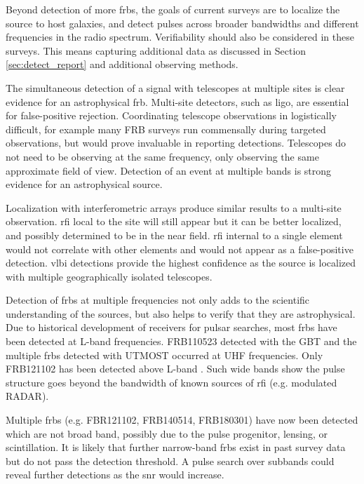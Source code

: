 \documentclass[a4paper,fleqn,usenatbib]{mnras}
\begin{document}
Beyond detection of more \glspl{frb}, the goals of current surveys are to
localize the source to host galaxies, and detect pulses across broader
bandwidths and different frequencies in the radio spectrum. Verifiability should
also be considered in these surveys. This means capturing additional data as
discussed in Section \ref{sec:detect_report} and additional observing methods.

The simultaneous detection of a signal with telescopes at multiple sites is
clear evidence for an astrophysical \gls{frb}.  Multi-site detectors, such as 
\gls{ligo}, are essential for false-positive rejection. Coordinating telescope
observations in logistically difficult, for example many FRB surveys run
commensally during targeted observations, but would prove invaluable in
reporting detections. Telescopes do not need to be observing at the same
frequency, only observing the same approximate field of view. Detection of an
event at multiple bands is strong evidence for an astrophysical source.

Localization with interferometric arrays produce similar results to a multi-site
observation. \gls{rfi} local to the site will still appear but it can be better
localized, and possibly determined to be in the near field. \gls{rfi} internal
to a single element would not correlate with other elements and would not appear
as a false-positive detection.  \gls{vlbi} detections provide the highest
confidence as the source is localized with multiple geographically isolated
telescopes.

Detection of \glspl{frb} at multiple frequencies not only adds to the scientific
understanding of the sources, but also helps to verify that they are
astrophysical.  Due to historical development of receivers for pulsar searches,
most \glspl{frb} have been detected at L-band frequencies. FRB110523
detected with the GBT and the multiple \glspl{frb} detected with UTMOST occurred
at UHF frequencies.  Only FRB121102 has been detected above L-band
\citep{atel10675}.  Such wide bands show the pulse structure goes beyond the
bandwidth of known sources of \gls{rfi} (e.g. modulated RADAR). 

Multiple \glspl{frb} (e.g. FBR121102, FRB140514, FRB180301) have now been
detected which are not broad band, possibly due to the pulse progenitor,
lensing, or scintillation. It is likely that further narrow-band \glspl{frb}
exist in past survey data but do not pass the detection threshold. A pulse
search over subbands could reveal further detections as the \gls{snr} would
increase.
\end{document}
